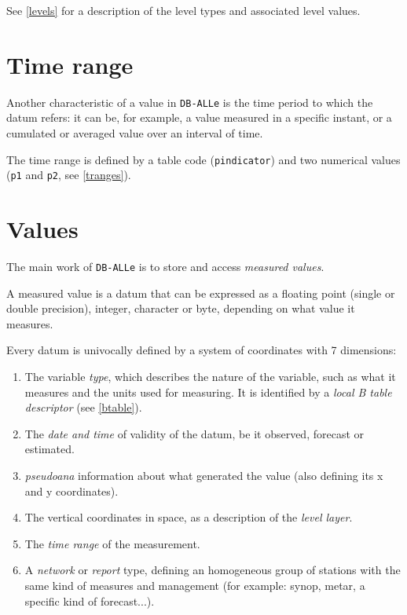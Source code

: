 \documentclass[final,12pt,a4paper,twoside]{book}
\newcommand{\dballe}{{\tt DB-ALLe}}
\begin{document}
See \ref{levels} for a description of the level types and associated level
values.


\section {Time range}

Another characteristic of a value in \dballe{} is the time period to which the
datum refers: it can be, for example, a value measured in a specific instant,
or a cumulated or averaged value over an interval of time.

The time range is defined by a table code (\texttt{pindicator}) and two
numerical values (\texttt{p1} and \texttt{p2}, see \ref{tranges}).

\section {Values}

The main work of \dballe{} is to store and access \emph{measured values}.

A measured value is a datum that can be expressed as a floating point (single
or double precision), integer, character or byte, depending on what value it
measures.

Every datum is univocally defined by a system of coordinates with 7 dimensions:

\begin{enumerate}
\item The variable \emph{type}, which describes the nature of the
      variable, such as what it measures and the units used for measuring.
      It is identified by a \emph{local B table descriptor} (see \ref{btable}).
\item The \emph{date and time} of validity of the datum, be it observed,
      forecast or estimated.
\item \emph{pseudoana} information about what generated the value (also
      defining its x and y coordinates).
\item The vertical coordinates in space, as a description of the \emph{level layer}.
\item The \emph{time range} of the measurement.
\item A \emph{network} or \emph{report} type, defining an homogeneous group of
      stations with the same kind of measures and management (for example:
      synop, metar, a specific kind of forecast...).
\end{enumerate}
\end{document}
